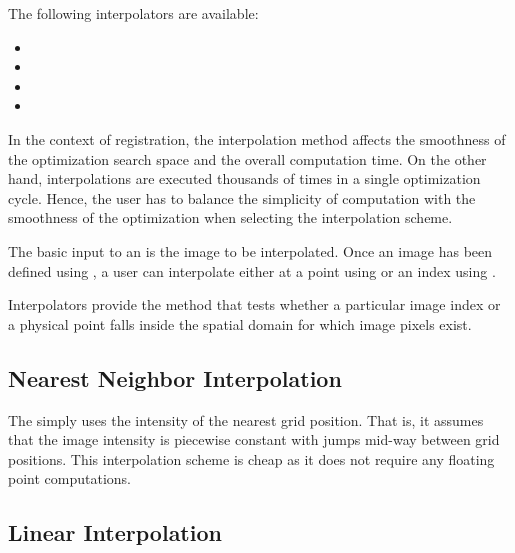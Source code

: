 The following interpolators are available:

\begin{itemize}
\item {}
\item {}
\item {}
\item {}
\end{itemize}

In the context of registration, the interpolation method affects the smoothness
of the optimization search space and the overall computation time. On the other
hand, interpolations are executed thousands of times in a single optimization
cycle. Hence, the user has to balance the simplicity of computation with the
smoothness of the optimization when selecting the interpolation scheme.


The basic input to an  is the image to
be interpolated. Once an image has been defined using ,
a user can interpolate either at a point using  or
an index using .

Interpolators provide the method  that tests whether a
particular image index or a physical point falls inside the spatial domain for
which image pixels exist.

\subsection{Nearest Neighbor Interpolation}
\label{sec:NearestNeighborInterpolation}
The  simply uses the
intensity of the nearest grid position. That is, it assumes that the image
intensity is piecewise constant with jumps mid-way between grid positions.
This interpolation scheme is cheap as it does not require any floating point
computations.


\subsection{Linear Interpolation}
\label{sec:LinearInterpolation}

